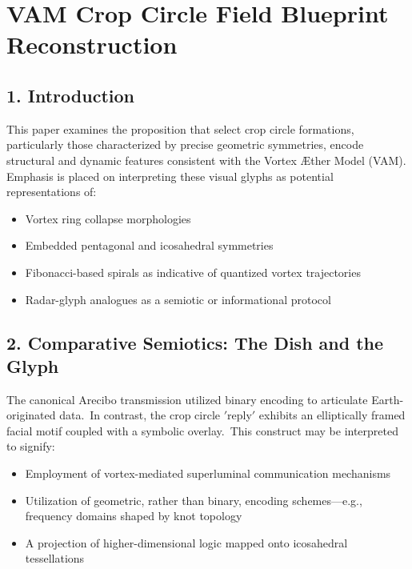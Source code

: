 \documentclass[11pt]{article}
\begin{document}
\section*{VAM Crop Circle Field Blueprint Reconstruction}


\subsection*{1. Introduction}

This paper examines the proposition that select crop circle formations, particularly those characterized by precise geometric symmetries, encode structural and dynamic features consistent with the Vortex \AE{}ther Model (VAM). Emphasis is placed on interpreting these visual glyphs as potential representations of:

\begin{itemize}

\item Vortex ring collapse morphologies

\item Embedded pentagonal and icosahedral symmetries

\item Fibonacci-based spirals as indicative of quantized vortex trajectories

\item Radar-glyph analogues as a semiotic or informational protocol

\end{itemize}


\subsection*{2. Comparative Semiotics: The Dish and the Glyph}

The canonical Arecibo transmission utilized binary encoding to articulate Earth-originated data.\ In contrast, the crop circle \('\)reply\('\) exhibits an elliptically framed facial motif coupled with a symbolic overlay.\ This construct may be interpreted to signify:

\begin{itemize}

\item Employment of vortex-mediated superluminal communication mechanisms

\item Utilization of geometric, rather than binary, encoding schemes—e.g., frequency domains shaped by knot topology

\item A projection of higher-dimensional logic mapped onto icosahedral tessellations

\end{itemize}
\end{document}

